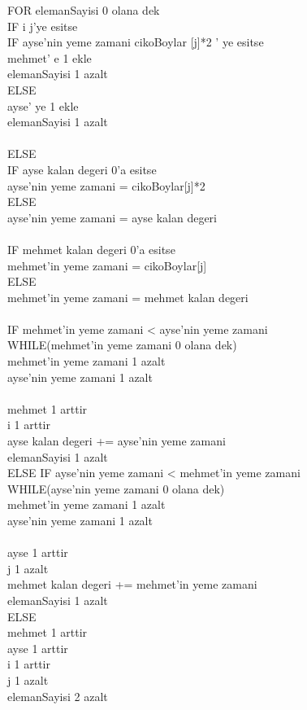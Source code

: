 \documentclass{article}
\begin{document}
\begin{itemize}
		FOR elemanSayisi 0 olana dek\\
		IF  i j'ye esitse\\
		IF ayse'nin yeme zamani cikoBoylar [j]*2 ' ye esitse\\
		mehmet' e 1 ekle\\
		elemanSayisi 1 azalt\\
		ELSE\\
		ayse' ye 1 ekle\\
		elemanSayisi 1 azalt\\ \\
		ELSE\\
		IF ayse kalan degeri 0'a esitse\\
		ayse'nin yeme zamani = cikoBoylar[j]*2\\
		ELSE\\
		ayse'nin yeme zamani = ayse kalan degeri\\ \\
		IF mehmet kalan degeri 0'a esitse\\
		mehmet'in yeme zamani = cikoBoylar[j]\\
		ELSE\\
		mehmet'in yeme zamani = mehmet kalan degeri\\ \\
		IF mehmet'in yeme zamani < ayse'nin yeme zamani\\
		WHILE(mehmet'in yeme zamani 0 olana dek)\\
		mehmet'in yeme zamani 1 azalt\\
		ayse'nin yeme zamani 1 azalt\\ \\
		mehmet 1 arttir\\
		i 1 arttir\\
		ayse kalan degeri += ayse'nin yeme zamani\\
		elemanSayisi 1 azalt\\
		ELSE IF ayse'nin yeme zamani < mehmet'in yeme zamani\\
		WHILE(ayse'nin yeme zamani 0 olana dek)\\
		mehmet'in yeme zamani 1 azalt\\
		ayse'nin yeme zamani 1 azalt\\ \\
		ayse 1 arttir\\
		j 1 azalt\\
		mehmet kalan degeri += mehmet'in yeme zamani\\
		elemanSayisi 1 azalt\\
		ELSE\\
		mehmet 1 arttir\\
		ayse 1 arttir\\
		i 1 arttir\\
		j 1 azalt\\
		elemanSayisi 2 azalt \\ \\
		

\end{itemize}
\end{document}
